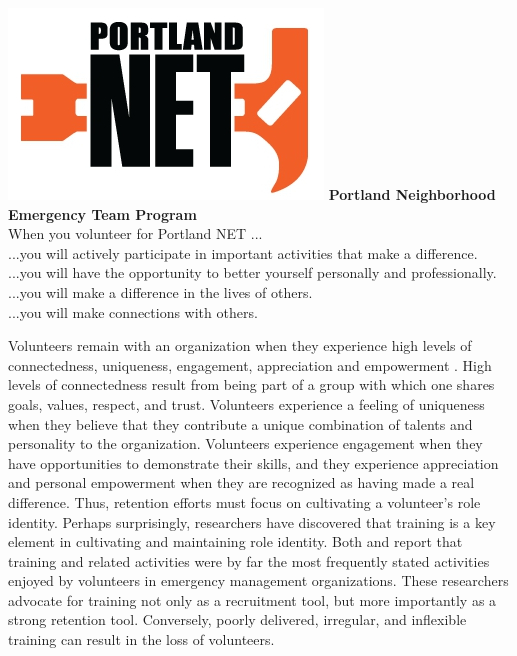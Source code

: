 \documentclass[11pt,fleqn]{book} %
\begin{document}
{\begin{minipage} [t][][c]{0.80\linewidth}
\includegraphics[scale=0.25]{graphics/NET_logo.jpg}
\textbf{Portland Neighborhood Emergency Team Program}\\
 When you volunteer for Portland NET ...\\
...you will actively participate in important activities that make a difference.\\
...you will have the opportunity to better yourself personally and professionally.\\
...you will make a difference in the lives of others.\\
...you will make connections with others.
 \end{minipage}
}

\bigskip
\bigskip
\noindent Volunteers remain with an organization when they experience high levels of connectedness, uniqueness, engagement, appreciation and empowerment \autocite{shields_young_2009}. High levels of connectedness result from being part of a group with which one shares goals, values, respect, and trust. Volunteers experience a feeling of uniqueness when they believe that they contribute a unique combination of talents and personality to the organization. Volunteers experience engagement when they have opportunities to demonstrate their skills, and they experience appreciation and personal empowerment when they are recognized as having made a real difference. Thus, retention efforts must focus on cultivating a volunteer's role identity. Perhaps surprisingly, researchers have discovered that training is a key element in cultivating and maintaining role identity. Both \textcite{ranse_engaging_2010} and \textcite{fahey_training_2002} report that training and related activities were by far the most frequently stated activities enjoyed by volunteers in emergency management organizations. These researchers advocate for training not only as a recruitment tool, but more importantly as a strong retention tool. Conversely, poorly delivered, irregular, and inflexible training can result in the loss of volunteers.
\end{document}
